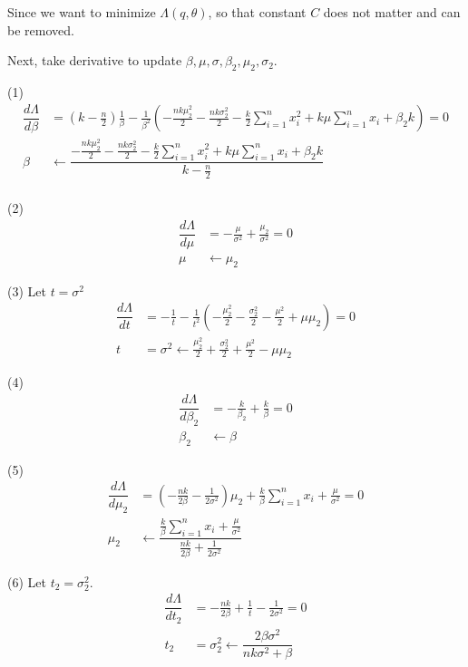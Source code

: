 \documentclass{amsart}
\begin{document}
Since we want to minimize $\Lambda(q, \theta)$, so that constant $C$ does not matter and can be removed.

Next, take derivative to update $\beta, \mu, \sigma, \beta_2, \mu_2, \sigma_2$.

(1)
\begin{align*}
	\dfrac{d\Lambda}{d\beta} &= (k-\frac{n}{2})\frac{1}{\beta} - \frac{1}{\beta^2}(-\frac{nk\mu_2^2}{2} - \frac{nk\sigma_2^2}{2} - \frac{k}{2}\sum_{i=1}^{n}x_i^2 + k\mu\sum_{i=1}^{n}x_i + \beta_2k) = 0\\
	\beta &\leftarrow \dfrac{-\frac{nk\mu_2^2}{2} - \frac{nk\sigma_2^2}{2} - \frac{k}{2}\sum_{i=1}^{n}x_i^2 + k\mu\sum_{i=1}^{n}x_i + \beta_2k}{k-\frac{n}{2}}\\
\end{align*}


(2)
\begin{align*}
	\dfrac{d\Lambda}{d\mu} &= -\frac{\mu}{\sigma^2} + \frac{\mu_2}{\sigma^2} = 0\\
	\mu &\leftarrow \mu_2
\end{align*}

(3)
Let $t=\sigma^2$
\begin{align*}
	\dfrac{d\Lambda}{dt} &= -\frac{1}{t} - \frac{1}{t^2}(-\frac{\mu_2^2}{2}-\frac{\sigma_2^2}{2} - \frac{\mu^2}{2} + \mu\mu_2) = 0\\
	t &= \sigma^2 \leftarrow \frac{\mu_2^2}{2}+\frac{\sigma_2^2}{2} + \frac{\mu^2}{2} - \mu\mu_2
\end{align*}

(4)
\begin{align*}
	\dfrac{d\Lambda}{d\beta_2} &= -\frac{k}{\beta_2} + \frac{k}{\beta} = 0 \\
	\beta_2 &\leftarrow \beta
\end{align*}

(5)
\begin{align*}
	\dfrac{d\Lambda}{d\mu_2} &= (-\frac{nk}{2\beta}-\frac{1}{2\sigma^2})\mu_2 + \frac{k}{\beta}\sum_{i=1}^{n}x_i + \frac{\mu}{\sigma^2} = 0\\
	\mu_2 &\leftarrow \dfrac{\frac{k}{\beta}\sum_{i=1}^{n}x_i + \frac{\mu}{\sigma^2}}{\frac{nk}{2\beta}+\frac{1}{2\sigma^2}}
\end{align*}

(6)
Let $t_2 = \sigma_2^2$.
\begin{align*}
	\dfrac{d\Lambda}{dt_2} &= -\frac{nk}{2\beta} + \frac{1}{t} - \frac{1}{2\sigma^2} = 0\\
	t_2 &= \sigma_2^2 \leftarrow \dfrac{2\beta\sigma^2}{nk\sigma^2 + \beta} 
\end{align*}
\end{document}
